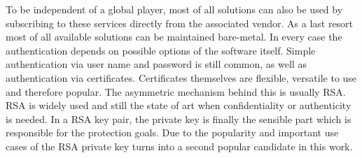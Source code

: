 To be independent of a global player, most of all solutions can also be used by subscribing to these services directly from the associated vendor.
As a last resort most of all available solutions can be maintained bare-metal.
In every case the authentication depends on possible options of the software itself. Simple authentication via user name and password is still common, as well as authentication via certificates.
Certificates themselves are flexible, versatile to use and therefore popular. The asymmetric mechanism behind this is usually RSA. RSA is widely used and still the state of art when confidentiality or authenticity
is needed. In a RSA key pair, the private key is finally the sensible part which is responsible for the protection goals. 
Due to the popularity and important use cases of the RSA private key turns into a second popular candidate in this work.


